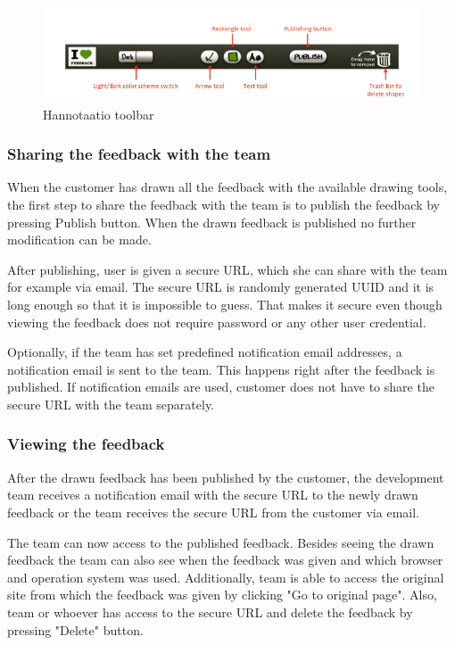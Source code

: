 \documentclass[english,12pt,a4paper,pdftex]{article}
\begin{document}
\begin{figure}[htb]
\begin{center}
\includegraphics[width=1.0\textwidth]{drawing_tools_annotated_crop.png}
\end{center}
\caption{Hannotaatio toolbar}
\end{figure}

\subsubsection{Sharing the feedback with the team}

When the customer has drawn all the feedback with the available drawing tools, the first step to share the feedback with the team is to publish the feedback by pressing Publish button. When the drawn feedback is published no further modification can be made.

After publishing, user is given a secure \ac{URL}, which she can share with the team for example via email. The secure \ac{URL} is randomly generated UUID and it is long enough so that it is impossible to guess. That makes it secure even though viewing the feedback does not require password or any other user credential.

Optionally, if the team has set predefined notification email addresses, a notification email is sent to the team. This happens right after the feedback is published. If notification emails are used, customer does not have to share the secure \ac{URL} with the team separately.

\subsubsection{Viewing the feedback}

After the drawn feedback has been published by the customer, the development team receives a notification email with the secure \ac{URL} to the newly drawn feedback or the team receives the secure \ac{URL} from the customer via email.

The team can now access to the published feedback. Besides seeing the drawn feedback the team can also see when the feedback was given and which browser and operation system was used. Additionally, team is able to access the original site from which the feedback was given by clicking "Go to original page". Also, team or whoever has access to the secure \ac{URL} and delete the feedback by pressing "Delete" button.
\end{document}
